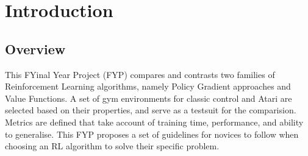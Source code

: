 


% 





\section{Introduction}

\subsection{Overview}

This FYinal Year Project (FYP) compares and contrasts two families of Reinforcement Learning algorithms, namely Policy Gradient approaches and Value Functions. A set of gym environments for classic control and Atari are selected based on their properties, and serve as a testsuit for the comparision. Metrics are defined that take account of training time,  performance, and ability to generalise. This FYP proposes a set of guidelines for novices to follow when choosing an RL algorithm to solve their specific problem.

